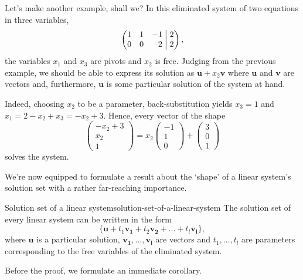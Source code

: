 Let's make another example, shall we? In this eliminated system of two equations
in three variables,
\[
 \left(
  \begin{matrix*}[r]
   1 & 1 & -1\\
   0 & 0 & 2 \\
  \end{matrix*}
  \hspace{1mm}
 \right|
 \left.
  \begin{matrix*}[r]
   2\\
   2
  \end{matrix*}
 \right),
\]
the variables $x_1$ and $x_3$ are pivots and $x_2$ is free. Judging from the
previous example, we should be able to express its solution as $\mathbf{u} + x_2
\mathbf{v}$ where $\mathbf{u}$ and $\mathbf{v}$ are vectors and, furthermore,
$\mathbf{u}$ is some particular solution of the system at hand.

Indeed, choosing $x_2$ to be a parameter, back-substitution yields $x_3 = 1$ and
$x_1 = 2 - x_2 + x_3 = -x_2 + 3$. Hence, every vector of the shape
\[
 \begin{pmatrix}
  -x_2 + 3\\
  x_2\\
  1
 \end{pmatrix} = x_2
 \begin{pmatrix}
  -1\\
  1\\
  0
 \end{pmatrix} + 
 \begin{pmatrix}
  3\\
  0\\
  1
 \end{pmatrix}
\]
solves the system.


We're now equipped to formulate a result about the `shape' of a linear system's
solution set with a rather far-reaching importance.

\begin{theorem}{Solution set of a linear system}{solution-set-of-a-linear-system}
 The solution set of every linear system can be written in the form
 \[
  \{\mathbf{u} + t_1 \mathbf{v_1} + t_2 \mathbf{v_2} + \ldots +
  t_l\mathbf{v_l}\},
 \]
 where $\mathbf{u}$ is a particular solution, $\mathbf{v_1},\ldots,\mathbf{v_l}$
 are vectors and $t_1,\ldots,t_l$ are parameters corresponding to the free
 variables of the eliminated system.
\end{theorem}

Before the proof, we formulate an immediate corollary.

